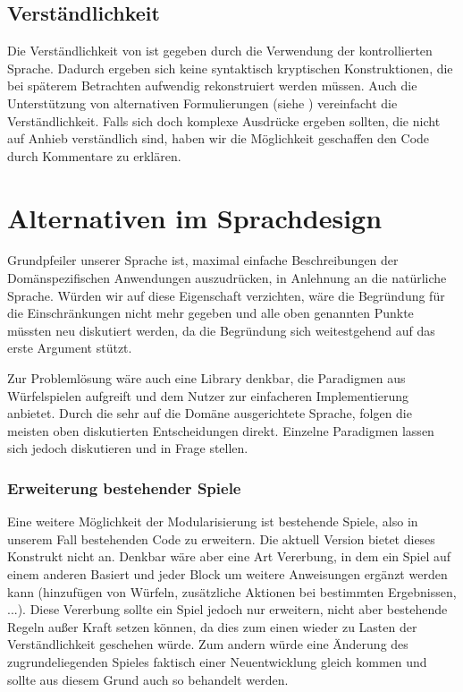 \subsection{Verständlichkeit} %
\label{sub:verstandlichkeit}
	Die Verständlichkeit von \dg ist gegeben durch die Verwendung der kontrollierten Sprache. Dadurch ergeben sich keine syntaktisch kryptischen Konstruktionen, die bei späterem Betrachten aufwendig rekonstruiert werden müssen. Auch die Unterstützung von alternativen Formulierungen (siehe ) vereinfacht die Verständlichkeit. Falls sich doch komplexe Ausdrücke ergeben sollten, die nicht auf Anhieb verständlich sind, haben wir die Möglichkeit geschaffen den Code durch Kommentare zu erklären.


\section{Alternativen im Sprachdesign} %
\label{sec:alternativen_im_sprachdesign} 

Grundpfeiler unserer Sprache ist, maximal einfache Beschreibungen der Domänspezifischen Anwendungen auszudrücken, in Anlehnung an die natürliche Sprache. Würden wir auf diese Eigenschaft verzichten, wäre die Begründung für die Einschränkungen nicht mehr gegeben und alle oben genannten Punkte müssten neu diskutiert werden, da die Begründung sich weitestgehend auf das erste Argument stützt. 

Zur Problemlösung wäre auch eine Library denkbar, die Paradigmen aus Würfelspielen aufgreift und dem Nutzer zur einfacheren Implementierung anbietet. Durch die sehr auf die Domäne ausgerichtete Sprache, folgen die meisten oben diskutierten Entscheidungen direkt. Einzelne Paradigmen lassen sich jedoch diskutieren und in Frage stellen.

\subsubsection{Erweiterung bestehender Spiele}
\label{subsub:erweiterung_bestehender_spiele}
	Eine weitere Möglichkeit der Modularisierung ist bestehende Spiele, also in unserem Fall bestehenden Code zu erweitern. Die aktuell \dg Version bietet dieses Konstrukt nicht an. Denkbar wäre aber eine Art Vererbung, in dem ein Spiel auf einem anderen Basiert und jeder Block um weitere Anweisungen ergänzt werden kann (hinzufügen von Würfeln, zusätzliche Aktionen bei bestimmten Ergebnissen, ...). Diese Vererbung sollte ein Spiel jedoch nur erweitern, nicht aber bestehende Regeln außer Kraft setzen können, da dies zum einen wieder zu Lasten der Verständlichkeit geschehen würde. Zum andern würde eine Änderung des zugrundeliegenden Spieles faktisch einer Neuentwicklung gleich kommen und sollte aus diesem Grund auch so behandelt werden.


